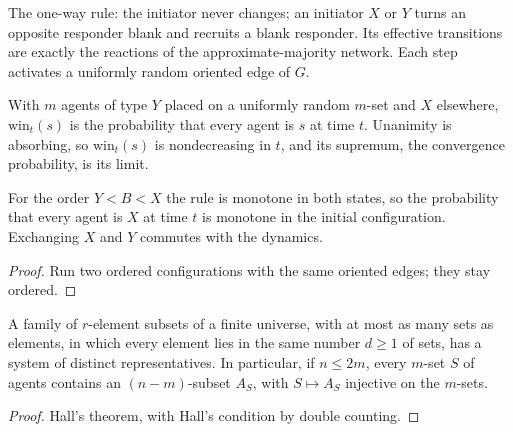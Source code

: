 \begin{definition}\label{def:am-graph}
\leanok{}
The one-way rule: the initiator never changes; an initiator $X$ or $Y$ turns an opposite responder
blank and recruits a blank responder. Its effective transitions are exactly the reactions of the
approximate-majority network. Each step activates a uniformly random oriented edge of $G$.
\end{definition}

\begin{definition}\label{def:winprob}
\leanok{}
With $m$ agents of type $Y$ placed on a uniformly random $m$-set and $X$ elsewhere,
$\mathrm{win}_t(s)$ is the probability that every agent is $s$ at time $t$. Unanimity is absorbing,
so $\mathrm{win}_t(s)$ is nondecreasing in $t$, and its supremum, the convergence probability, is
its limit.
\end{definition}

\begin{lemma}\label{lem:am-coupling}
\leanok{}
For the order $Y < B < X$ the rule is monotone in both states, so the probability that every agent
is $X$ at time $t$ is monotone in the initial configuration. Exchanging $X$ and $Y$ commutes with
the dynamics.
\end{lemma}
\begin{proof}\leanok
Run two ordered configurations with the same oriented edges; they stay ordered.
\end{proof}

\begin{lemma}\label{lem:hall}
\leanok
A family of $r$-element subsets of a finite universe, with at most as many sets as elements, in
which every element lies in the same number $d \ge 1$ of sets, has a system of distinct
representatives. In particular, if $n \le 2m$, every $m$-set $S$ of agents contains an
$(n - m)$-subset $A_S$, with $S \mapsto A_S$ injective on the $m$-sets.
\end{lemma}
\begin{proof}\leanok
Hall's theorem, with Hall's condition by double counting.
\end{proof}

